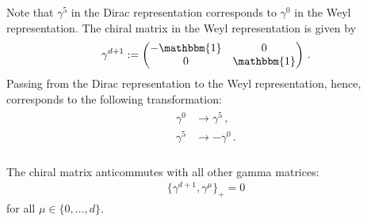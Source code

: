     \begin{remark}
        Note that $\gamma^5$ in the Dirac representation corresponds to $\gamma^0$ in the Weyl representation. The chiral matrix in the Weyl representation is given by
        \begin{gather}
            \gamma^{d+1} :=
            \begin{pmatrix}
                -\mathbbm{1}&0\\
                0&\mathbbm{1}
            \end{pmatrix}\,.
        \end{gather}
        Passing from the Dirac representation to the Weyl representation, hence, corresponds to the following transformation:
        \begin{gather}
            \begin{aligned}
                \gamma^0&\longrightarrow\gamma^5\,,\\
                \gamma^5&\longrightarrow-\gamma^0\,.\\
            \end{aligned}
        \end{gather}
    \end{remark}

    \begin{property}
        The chiral matrix anticommutes with all other gamma matrices:
        \begin{gather}
            \{\gamma^{d+1},\gamma^\mu\}_+=0
        \end{gather}
        for all $\mu\in\{0,\ldots,d\}$.
    \end{property}



